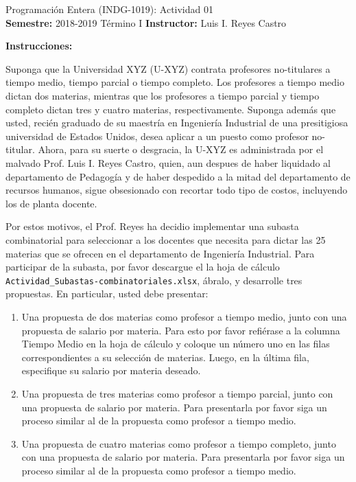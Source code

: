\documentclass[ a4paper, twoside, 11pt]{article}
\newcommand{\numero}{01}
\begin{document}
\allowdisplaybreaks



\begin{center}
\Large Programaci\'on Entera (INDG-1019): Actividad \numero \\[1ex]
\small \textbf{Semestre:} 2018-2019 T\'ermino I \qquad
\textbf{Instructor:} Luis I. Reyes Castro
\end{center}
\halfskip

\textbf{Instrucciones:}

Suponga que la Universidad XYZ (U-XYZ) contrata profesores no-titulares a tiempo medio, tiempo parcial o tiempo completo. Los profesores a tiempo medio dictan dos materias, mientras que los profesores a tiempo parcial y tiempo completo dictan tres y cuatro materias, respectivamente. Suponga adem\'as que usted, reci\'en graduado de su maestr\'ia en Ingenier\'ia Industrial de una presitigiosa universidad de Estados Unidos, desea aplicar a un puesto como profesor no-titular. Ahora, para su suerte o desgracia, la U-XYZ es administrada por el malvado Prof. Luis I. Reyes Castro, quien, aun despues de haber liquidado al departamento de Pedagog\'ia y de haber despedido a la mitad del departamento de recursos humanos, sigue obsesionado con recortar todo tipo de costos, incluyendo los de planta docente. 

Por estos motivos, el Prof. Reyes ha decidio implementar una subasta combinatorial para seleccionar a los docentes que necesita para dictar las 25 materias que se ofrecen en el departamento de Ingenier\'ia Industrial. Para participar de la subasta, por favor descargue el la hoja de c\'alculo \texttt{Actividad\_Subastas-combinatoriales.xlsx}, \'abralo, y desarrolle tres propuestas. En particular, usted debe presentar: 

\begin{enumerate}
\item Una propuesta de dos materias como profesor a tiempo medio, junto con una propuesta de salario por materia. Para esto por favor refi\'erase a la columna Tiempo Medio en la hoja de c\'alculo y coloque un n\'umero uno en las filas correspondientes a su selecci\'on de materias. Luego, en la \'ultima fila, especifique su salario por materia deseado. 
\item Una propuesta de tres materias como profesor a tiempo parcial, junto con una \linebreak propuesta de salario por materia. Para presentarla por favor siga un proceso similar al de la propuesta como profesor a tiempo medio. 
\item Una propuesta de cuatro materias como profesor a tiempo completo, junto con una \linebreak propuesta de salario por materia. Para presentarla por favor siga un proceso similar al de la propuesta como profesor a tiempo medio. 
\end{enumerate}
\end{document}
